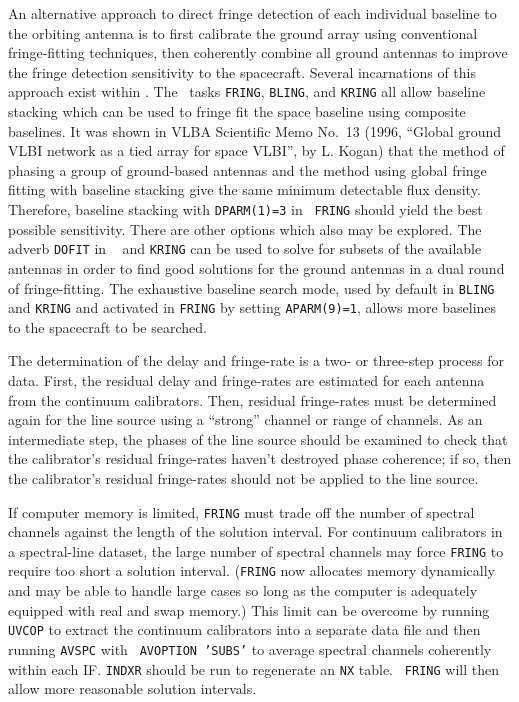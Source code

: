
An alternative approach to direct fringe detection of each individual
baseline to the orbiting antenna is to first calibrate the ground
array using conventional fringe-fitting techniques, then coherently
combine all ground antennas to improve the fringe detection
sensitivity to the spacecraft.  Several incarnations of this approach
exist within \AIPS\@.  The \AIPS\ tasks {\tt FRING}, {\tt BLING}, and
{\tt KRING} all allow baseline stacking which can be used to fringe
fit the space baseline using composite baselines.  It was shown in
VLBA Scientific Memo No.~13 (1996, ``Global ground VLBI network as a
tied array for space VLBI'', by L. Kogan) that the method of phasing a
group of ground-based antennas and the method using global fringe
fitting with baseline stacking give the same minimum detectable flux
density.  Therefore, baseline stacking with {\tt DPARM(1)=3} in {\tt
FRING} should yield the best possible sensitivity.  There are other
options which also may be explored.  The adverb {\tt DOFIT} in {\tt
{}} and {\tt KRING} can be used to solve for subsets of the
available antennas in order to find good solutions for the ground
antennas in a dual round of fringe-fitting.  The exhaustive baseline
search mode, used by default in {\tt BLING} and {\tt KRING} and
activated in {\tt FRING} by setting {\tt APARM(9)=1}, allows more
baselines to the spacecraft to be searched.


The determination of the delay and fringe-rate  is a
two- or three-step process for   data.
First, the residual delay and fringe-rates are estimated for each
antenna from the continuum calibrators.  Then, residual fringe-rates
must be determined again for the line source using a ``strong''
channel or range of channels.  As an intermediate step, the phases of
the line source should be examined to check that the calibrator's
residual fringe-rates haven't destroyed phase coherence; if so, then
the calibrator's residual fringe-rates should not be applied to the
line source.

If computer memory is limited, {\tt FRING} must trade off the number
of spectral channels against the length of the solution interval.  For
continuum calibrators in a spectral-line dataset, the large number of
spectral channels may force {\tt FRING} to require too short a
solution interval.  ({\tt FRING} now allocates memory dynamically and
may be able to handle large cases so long as the computer is
adequately equipped with real and swap memory.)  This limit can be
overcome by running {\tt UVCOP} to extract the continuum calibrators
into a separate data file and then running {\tt AVSPC} with {\tt
AVOPTION 'SUBS'} to average spectral channels coherently within each
IF\@. {\tt INDXR} should be run to regenerate an {\tt NX} table. {\tt
FRING} will then allow more reasonable solution intervals.

